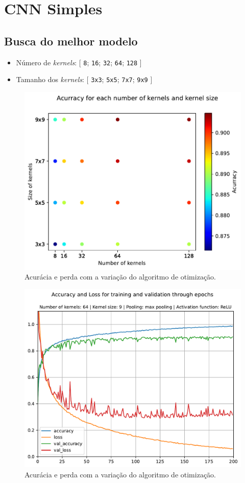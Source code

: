 \clearpage
\section{CNN Simples}



\subsection{Busca do melhor modelo}

\begin{itemize}
	\item Número de \textit{kernels}: [ \texttt{8}; \texttt{16}; \texttt{32}; \texttt{64}; \texttt{128} ]
	\item Tamanho dos \textit{kernels}: [ \texttt{3x3}; \texttt{5x5}; \texttt{7x7}; \texttt{9x9} ]
\end{itemize}

\begin{figure}[H]
\centering
\includegraphics[width=0.75\linewidth]{../../plot/cnn_shallow/hiper_parameters_search}
\caption{Acurácia e perda com a variação do algoritmo de otimização.}
\label{fig:hiper_parameters_search}
\end{figure}

\begin{figure}[H]
\centering
\includegraphics[width=0.75\linewidth]{../../plot/cnn_shallow/best_model_training}
\caption{Acurácia e perda com a variação do algoritmo de otimização.}
\label{fig:best_model_training}
\end{figure}

